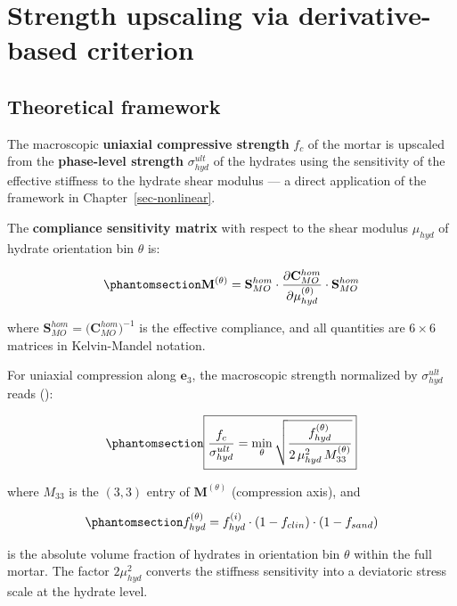\documentclass[
  a4paper,
  numbers=noendperiod,
  DIV=12]{scrreprt}
\newcommand{\uu}[1]{{\symbf{{#1}}}}
\begin{document}
\section{Strength upscaling via derivative-based
criterion}\label{sec-pichler-strength}

\subsection{Theoretical framework}\label{sec-strength-theory}

The macroscopic \textbf{uniaxial compressive strength} \(f_c\) of the
mortar is upscaled from the \textbf{phase-level strength}
\(\sigma^{ult}_{hyd}\) of the hydrates using the sensitivity of the
effective stiffness to the hydrate shear modulus --- a direct
application of the framework in Chapter~\ref{sec-nonlinear}.

The \textbf{compliance sensitivity matrix} with respect to the shear
modulus \(\mu_{hyd}\) of hydrate orientation bin \(\theta\) is:

\begin{equation}\protect\phantomsection\label{eq-M-sens}{
\mathbf{M}^{(\theta)} = \mathbf{S}^{hom}_{MO} \cdot \frac{\partial \mathbf{C}^{hom}_{MO}}{\partial \mu_{hyd}^{(\theta)}} \cdot \mathbf{S}^{hom}_{MO}
}\end{equation}

where \(\mathbf{S}^{hom}_{MO} = \bigl(\mathbf{C}^{hom}_{MO}\bigr)^{-1}\)
is the effective compliance, and all quantities are \(6\times 6\)
matrices in Kelvin-Mandel notation.

For uniaxial compression along \(\uu{e}_3\), the macroscopic strength
normalized by \(\sigma^{ult}_{hyd}\) reads
():

\begin{equation}\protect\phantomsection\label{eq-fc}{
\boxed{\frac{f_c}{\sigma^{ult}_{hyd}} = \min_\theta \sqrt{\frac{f^{(\theta)}_{hyd}}{2\,\mu_{hyd}^2\,M^{(\theta)}_{33}}}}
}\end{equation}

where \(M_{33}\) is the \((3,3)\) entry of \(\mathbf{M}^{(\theta)}\)
(compression axis), and

\begin{equation}\protect\phantomsection\label{eq-fhyd-abs}{
f^{(\theta)}_{hyd} = f_{hyd}^{(i)} \cdot (1 - f_{clin}) \cdot (1 - f_{sand})
}\end{equation}

is the absolute volume fraction of hydrates in orientation bin
\(\theta\) within the full mortar. The factor \(2\mu_{hyd}^2\) converts
the stiffness sensitivity into a deviatoric stress scale at the hydrate
level.
\end{document}
